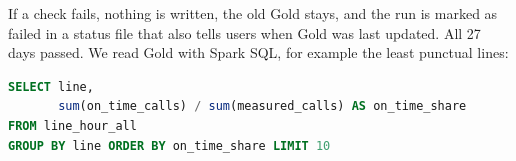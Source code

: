 If a check fails, nothing is written, the old Gold stays, and the run is marked as failed in a
status file that also tells users when Gold was last updated. All 27 days passed. We read Gold
with Spark SQL, for example the least punctual lines:

\begin{lstlisting}[language=SQL]
SELECT line,
       sum(on_time_calls) / sum(measured_calls) AS on_time_share
FROM line_hour_all
GROUP BY line ORDER BY on_time_share LIMIT 10
\end{lstlisting}
